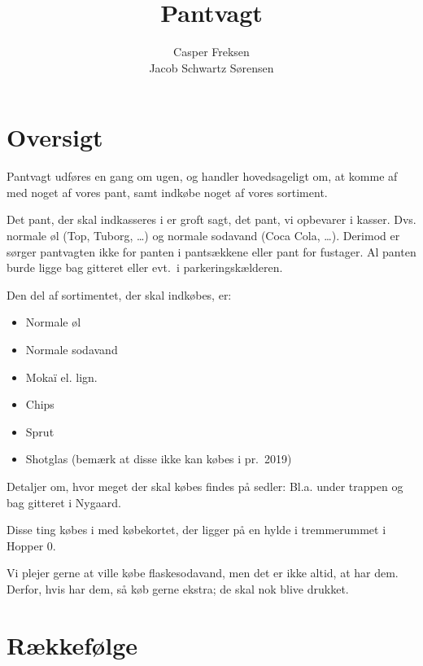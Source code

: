 

\title{Pantvagt}
\date{}
\author{Casper Freksen\\
Jacob Schwartz Sørensen}



\newcommand{\shoppingcartloc}{tremmerummet i Hopper-0}

\maketitle

\section{Oversigt}
\label{sec:oversigt}

Pantvagt udføres en gang om ugen, og handler hovedsageligt om, at
komme af med noget af vores pant, samt indkøbe noget af vores
sortiment.

Det pant, der skal indkasseres i \fotex er groft sagt, det pant, vi
opbevarer i kasser. Dvs. normale øl (Top, Tuborg, \dots) og normale
sodavand (Coca Cola, \dots).
Derimod er sørger pantvagten ikke for panten i pantsækkene
eller pant for fustager.
Al panten burde ligge bag gitteret eller evt.\ i parkeringskælderen.

Den del af sortimentet, der skal indkøbes, er:
\begin{itemize}
\item Normale øl
\item Normale sodavand
\item Mokaï\textsuperscript{\textregistered} el. lign.
\item Chips
\item Sprut
\item Shotglas (bemærk at disse ikke kan købes i \fotex pr.\ 2019)
\end{itemize}
Detaljer om, hvor meget der skal købes findes på sedler: Bl.a. under
trappen og bag gitteret i Nygaard.

Disse ting købes i \fotex med købekortet, der ligger på en hylde i
tremmerummet i Hopper 0.

Vi plejer gerne at ville købe flaskesodavand, men det er ikke altid,
at \fotex har dem. Derfor, hvis \fotex har dem, så køb gerne ekstra; de
skal nok blive drukket.

\section{Rækkefølge}
\label{sec:rakkefolge}

